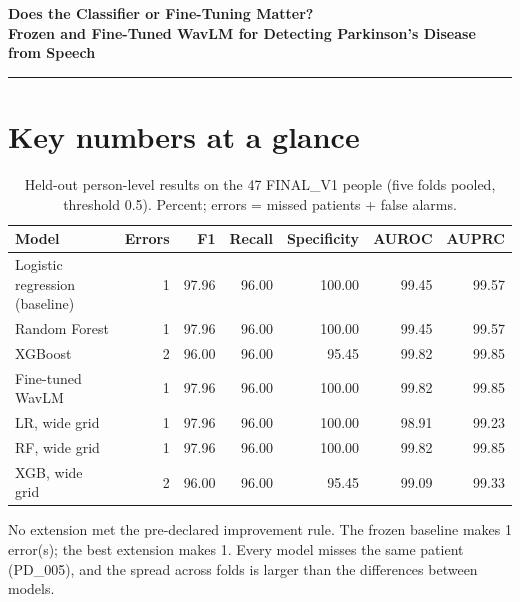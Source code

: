 \documentclass[11pt,a4paper]{article}
\begin{document}
\begin{center}{\LARGE\bfseries Does the Classifier or Fine-Tuning Matter?\\[3pt]\Large Frozen and Fine-Tuned WavLM for Detecting Parkinson's Disease from Speech\par}\vspace{8pt}{\large Baseline-and-extensions study on the FINAL\_V1 folds (CSE 431, topic 4a)\par}\vspace{6pt}{\small Evidence: frozen protocol FINAL\_V1 (47 people, 785 recordings, five speaker-disjoint folds); amendments A2 and A3, declared before their runs.\par}\end{center}
\vspace{4pt}\hrule\vspace{6pt}
\tableofcontents
\newpage
\section*{Key numbers at a glance}
\begin{table}[H]\centering\footnotesize\renewcommand{\arraystretch}{1.15}
\caption{Held-out person-level results on the 47 FINAL\_V1 people (five folds pooled, threshold 0.5). Percent; errors = missed patients + false alarms.}
\begin{tabular}{lrrrrrr}
\toprule
\textbf{Model} & \textbf{Errors} & \textbf{F1} & \textbf{Recall} & \textbf{Specificity} & \textbf{AUROC} & \textbf{AUPRC}\\
\midrule
Logistic regression (baseline) & 1 & 97.96 & 96.00 & 100.00 & 99.45 & 99.57\\
Random Forest & 1 & 97.96 & 96.00 & 100.00 & 99.45 & 99.57\\
XGBoost & 2 & 96.00 & 96.00 & 95.45 & 99.82 & 99.85\\
Fine-tuned WavLM & 1 & 97.96 & 96.00 & 100.00 & 99.82 & 99.85\\
LR, wide grid & 1 & 97.96 & 96.00 & 100.00 & 98.91 & 99.23\\
RF, wide grid & 1 & 97.96 & 96.00 & 100.00 & 99.82 & 99.85\\
XGB, wide grid & 2 & 96.00 & 96.00 & 95.45 & 99.09 & 99.33\\
\bottomrule
\end{tabular}\end{table}
\begin{tcolorbox}[colback=orange!5,colframe=orange!70!black,boxrule=0.5pt,arc=2pt,left=5pt,right=5pt,top=3pt,bottom=3pt,title={\small\bfseries Key finding}]\small No extension met the pre-declared improvement rule. The frozen baseline makes 1 error(s); the best extension makes 1. Every model misses the same patient (PD\_005), and the spread across folds is larger than the differences between models.\end{tcolorbox}
\end{document}
